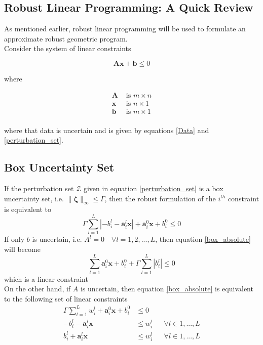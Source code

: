 \documentclass{article}
\renewcommand{\vec}{\mathbf}
\newcommand{\mat}{\mathbf}
\begin{document}
\begin{appendices}

\section{Robust Linear Programming: A Quick Review}

As mentioned earlier, robust linear programming will be used to formulate an approximate robust geometric program.\\[12pt]
Consider the system of linear constraints

\begin{equation*}
    \mat{A}\vec{x} + \vec{b} \leq 0
\end{equation*}

where

\begin{equation*}
\begin{aligned}
\mat{A} &\text{ is $m \times n$}\\
\vec{x} &\text{ is $n \times 1$}\\
\vec{b} &\text{ is $m \times 1$}\\
\end{aligned}
\end{equation*}

where that data is uncertain and is given by equations \eqref{Data} and \eqref{perturbation_set}.

\subsection{Box Uncertainty Set}
If the perturbation set $\mathcal{Z}$ given in equation \eqref{perturbation_set} is a box uncertainty set, i.e. $\|\vec{\zeta}\|_{\infty} \leq \Gamma$, then the robust formulation of the $i^{th}$ constraint is equivalent to
\begin{equation}
\Gamma \textstyle{\sum}_{l=1}^L |- {b}^l_{i} - \vec{a}^l_i\vec{x}| + \vec{a}^0_i\vec{x} + b^0_i \leq 0
\label{box_absolute}
\end{equation}
If only $b$ is uncertain, i.e. $A^l = 0 \quad \forall l = 1,2,...,L$, then equation \eqref{box_absolute} will become
\begin{equation}
\textstyle{\sum}_{l=1}^L \vec{a}^0_{i}\vec{x} + b^0_{i} + \Gamma \textstyle{\sum}_{l=1}^L |b^l_{i}| \leq 0
\label{box_coeff}
\end{equation}
which is a linear constraint\\
On the other hand, if $A$ is uncertain, then equation \eqref{box_absolute} is equivalent to the following set of linear constraints
\begin{equation}
\begin{aligned}
\Gamma \textstyle{\sum}_{l=1}^L w^l_{i} + \vec{a}^0_{i}\vec{x} + b^0_{i} &\leq 0\\
- b^l_{i} - \vec{a}^l_{i}\vec{x} &\leq w^l_{i} &&\forall l \in 1,...,L\\
b^l_{i} + \vec{a}^l_{i}\vec{x} &\leq w^l_{i} &&\forall l \in 1,...,L\\
\end{aligned}
\label{box_linear}
\end{equation}


\end{appendices}
\end{document}
